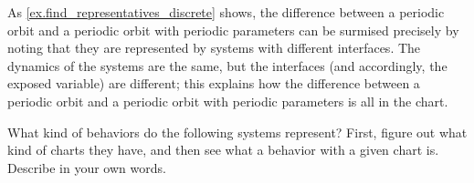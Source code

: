 \documentclass[DynamicalBook]{subfiles}
\begin{document}
\begin{remark}\label{rmk.periodic_parameters_versus_not}
As \cref{ex.find_representatives_discrete} shows, the difference between a
periodic orbit and a periodic orbit with periodic parameters can be surmised
precisely by noting that they are represented by systems with different
interfaces. The dynamics of the systems are the same, but the interfaces (and
accordingly, the exposed variable) are different; this explains how the
difference between a periodic orbit and a periodic orbit with periodic
parameters is all in the chart.
\end{remark}

\begin{exercise}\label{ex.represents_what_discrete}
  What kind of behaviors do the following systems represent? First, figure out
  what kind of charts they have, and then see what a behavior with a given chart
  is. Describe in your own words.


\end{exercise}
\end{document}
